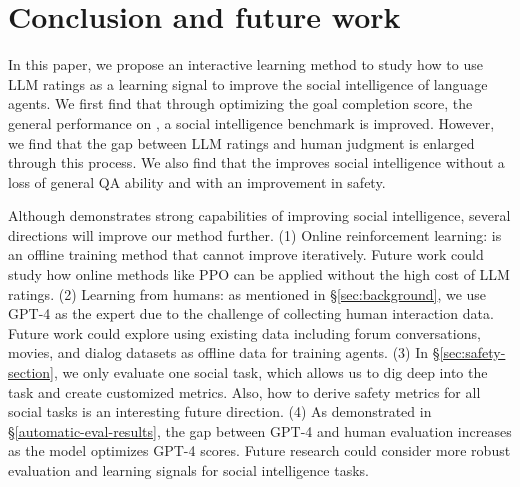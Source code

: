 \section{Conclusion and future work}
In this paper, we propose an interactive learning method \model to study how to use LLM ratings as a learning signal to improve the social intelligence of language agents. We first find that through optimizing the goal completion score, the general performance on \sotopia \citep{sotopia}, a social intelligence benchmark is improved. However, we find that the gap between LLM ratings and human judgment is enlarged through this process. We also find that the \model improves social intelligence without a loss of general QA ability and with an improvement in safety. 

Although \model demonstrates strong capabilities of improving social intelligence, several directions will improve our method further. (1) Online reinforcement learning: \model is an offline training method that cannot improve iteratively. Future work could study how online methods like PPO \cite{schulman2017proximal} can be applied without the high cost of LLM ratings.  (2) Learning from humans: as mentioned in \S\ref{sec:background}, we use GPT-4 as the expert due to the challenge of collecting human interaction data. Future work could explore using existing data including forum conversations, movies, and dialog datasets as offline data for training agents. (3) In \S\ref{sec:safety-section}, we only evaluate one social task, which allows us to dig deep into the task and create customized metrics. Also, how to derive safety metrics for all social tasks is an interesting future direction. (4) As demonstrated in \S\ref{automatic-eval-results}, the gap between GPT-4 and human evaluation increases as the model optimizes GPT-4 scores. Future research could consider more robust evaluation and learning signals for social intelligence tasks. 
